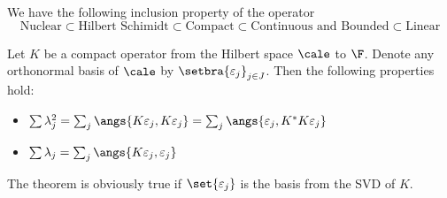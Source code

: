 \begin{remark}
    We have the following inclusion property of the operator \begin{equation*}
        \text{Nuclear} \subset \text{Hilbert Schimidt} \subset \text{Compact} \subset \text{Continuous and Bounded} \subset \text{Linear}
    \end{equation*}
\end{remark}

\begin{theorem}
    Let $K$ be a compact operator from the Hilbert space $\cale$ to $\F$. Denote any orthonormal basis of $\cale$ by $\setbra{\varepsilon_j}_{j\in J}$. Then the following properties hold:
    \begin{itemize}
        \item $\sum \lambda_j^2 = \sum_j \angs{K\varepsilon_j,K\varepsilon_j}=\sum_j \angs{\varepsilon_j,K^*K\varepsilon_j}$
        \item $\sum \lambda_j = \sum_j \angs{K\varepsilon_j,\varepsilon_j}$
    \end{itemize}
\end{theorem}
The theorem is obviously true if $\set{\varepsilon_j}$ is the basis from the SVD of $K$.









